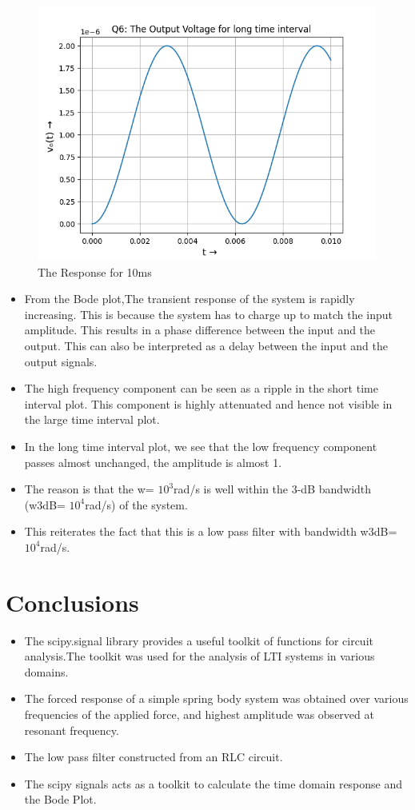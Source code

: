 \documentclass[11pt, a4paper]{article}
\begin{document}
\begin{figure}[!tbh]
 \centering
 \includegraphics[scale=0.7]{Ass6_Figure_7.png} 
 \caption{The Response for 10ms}
\end{figure}
\begin{itemize}
    \item From the Bode plot,The transient response of the system is rapidly increasing.  This is because the system has to charge up to match the input amplitude.  This results in a phase difference between the input and the output.   This can also be interpreted as a delay between the input and the output signals.
    \item The high frequency component can be seen as a ripple in the short time interval plot.  This component is highly attenuated and hence not visible in the large time interval plot.
    \item In the long time interval plot, we see that the low frequency component passes almost unchanged, the amplitude is  almost  1.
    \item The  reason  is  that  the w=  $10^3$rad/s is  well  within  the  3-dB bandwidth (w3dB= $10^4$rad/s) of the system.
    \item This reiterates the fact that this is a low pass filter with bandwidth w3dB= $10^4$rad/s.
\end{itemize}

\section{ Conclusions}
\begin{itemize}
    \item The scipy.signal library provides a useful toolkit of functions for circuit analysis.The toolkit was  used for the analysis of LTI systems in various domains.
    \item The forced response of a simple spring body system was obtained over  various  frequencies  of  the  applied  force,  and  highest  amplitude  was observed at resonant frequency.
    \item The low pass filter constructed from an RLC circuit.
    \item The scipy signals acts as a toolkit to calculate the time domain response and the Bode Plot.
\end{itemize}
\end{document}

